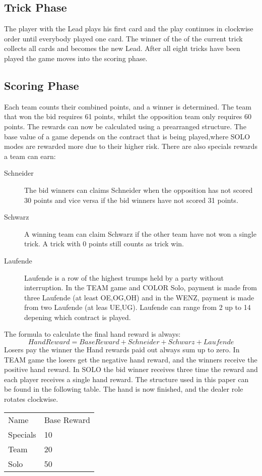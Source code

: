 \subsection{Trick Phase}
The player with the Lead plays his first card and the play continues in clockwise order until everybody played one
card.
The winner of the of the current trick collects all cards and becomes the new Lead.
After all eight tricks have been played the game moves into the scoring phase.
\subsection{Scoring Phase}
Each team counts their combined points, and a winner is determined.
The team that won the bid requires 61 points, whilst the opposition team only requires 60 points.
The rewards can now be calculated using a prearranged structure.
The base value of a game depends on the contract
that is being played,where SOLO modes are rewarded more due to their higher risk.
\newline
There are also specials rewards a team can earn:
\begin{description}
    \item[Schneider] The bid winners can claims Schneider when the opposition has not scored 30 points and vice versa
    if the bid winners have not scored 31 points.
    \item[Schwarz] A winning team can claim Schwarz if the other team have not won a single trick. A trick with 0
    points still counts as trick win.
    \item[Laufende] Laufende is a row of the highest trumps held by a party without interruption.
    In the TEAM game and COLOR Solo, payment is made from three Laufende (at least OE,OG,OH) and in the WENZ,
    payment is made from two Laufende (at leas UE,UG). Laufende can range from 2 up to 14 depening which contract is
    played.
\end{description}
The formula to calculate the final hand reward is always:
\begin{equation*}
    Hand Reward = Base Reward + Schneider + Schwarz + Laufende
\end{equation*}
Losers pay the winner the Hand rewards paid out always sum up to zero.
In TEAM game the losers get the negative hand reward, and the winners receive the positive hand reward.
In SOLO the bid winner receives three time the reward and each player receives a single hand reward.
The structure used in this paper can be found in the following table.
The hand is now finished, and the dealer role rotates clockwise.
\begin{table}[]
\begin{tabular}{ll}
Name     & Base Reward \\
Specials & 10          \\
Team     & 20          \\
Solo     & 50    
\end{tabular}\label{tab:table3}
\end{table}
